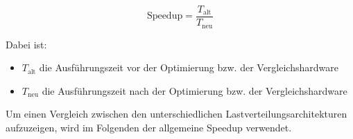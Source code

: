 \begin{equation}
\text{Speedup} = \frac{T_{\text{alt}}}{T_{\text{neu}}}
\end{equation}

Dabei ist:
\begin{itemize}
  \item $T_{\text{alt}}$ die Ausführungszeit vor der Optimierung bzw. der Vergleichshardware
  \item $T_{\text{neu}}$ die Ausführungszeit nach der Optimierung bzw. der Vergleichshardware
\end{itemize}
Um einen Vergleich zwischen den unterschiedlichen Lastverteilungsarchitekturen aufzuzeigen, wird im Folgenden der allgemeine Speedup verwendet.